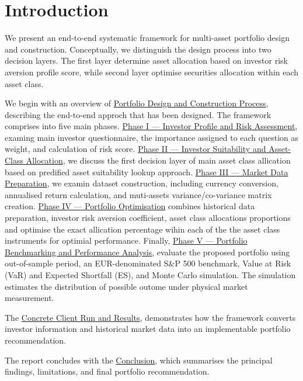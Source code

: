 \documentclass[11pt,a4paper]{article}
\begin{document}

\section{Introduction}
\label{sec:introduction}

We present an end-to-end systematic framework for multi-asset portfolio design and construction. Conceptually, we distinguish the design process into two decision layers. The first layer determine asset allocation based on investor risk aversion profile score, while second layer optimise securities allocation within each asset class.

We begin with an overview of \hyperref[sec:methodology]{Portfolio Design and Construction Process}, describing the end-to-end approch that has been designed. The framework comprises into five main phases. \hyperref[sec:phase-one]{Phase I --- Investor Profile and Risk Assessment}, examing main investor questionnaire, the importance assigned to each question as weight, and calculation of risk score. \hyperref[sec:phase-two]{Phase II --- Investor Suitability and Asset-Class Allocation}, we discuss the first decision layer of main asset class allication based on predified asset suitability lookup approach. \hyperref[sec:phase-three]{Phase III --- Market Data Preparation}, we examin dataset construction, including currency conversion, annualised return calculation, and muti-assets variance/co-variance matrix creation. \hyperref[sec:phase-four]{Phase IV --- Portfolio Optimisation} combines historical data preparation, investor risk aversion coefficient, asset class allocations proportions and optimise the exact allication percentage wihin each of the the asset class instruments for optimial performance. Finally, \hyperref[sec:phase-five]{Phase V --- Portfolio Benchmarking and Performance Analysis}, evaluate the proposed portfolio using out-of-sample period, an EUR-denominated S\&P 500 benchmark, Value at Risk (VaR) and Expected Shortfall (ES), and Monte Carlo simulation. The simulation estimates the distribution of possible outome under physical market measurement.

The \hyperref[sec:concrete-run]{Concrete Client Run and Results}, demonstrates how the framework converts investor information and historical market data into an implementable portfolio recommendation.

The report concludes with the \hyperref[sec:conclusion]{Conclusion}, which summarises the principal findings, limitations, and final portfolio recommendation.
\end{document}
